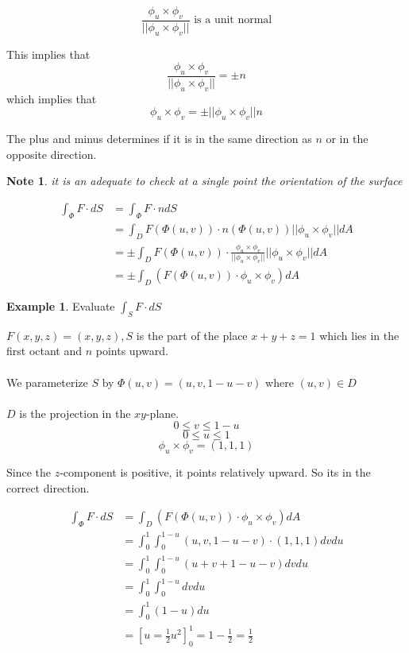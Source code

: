 \documentclass[12pt]{article}
\theoremstyle{plain}
\newtheorem*{note}{Note}
\theoremstyle{definition}
\newtheorem{example}[theorem]{Example}
\begin{document}
$$\frac{\phi_u \times \phi_v}{||\phi_u \times \phi_v||} \text{ is a unit normal}$$

This implies that 
$$\frac{\phi_u \times \phi_v}{||\phi_u \times \phi_v||} = \pm n$$
which implies that
$$\phi_u \times \phi_v = \pm || \phi_u \times \phi_v|| n$$

The plus and minus determines if it is in the same direction as $n$ or in the opposite direction.

\begin{note}
	it is an adequate to check at a single point the orientation of the surface 
\end{note}


\begin{align*}
	\int_\Phi F \cdot dS &= \int_\Phi F \cdot n dS\\
	&= \int_D F (\Phi (u,v)) \cdot n (\Phi(u,v)) || \phi_u \times \phi_v|| dA\\
	&= \pm \int_D F (\Phi (u,v)) \cdot \frac{\phi_u \times \phi_v}{||\phi_u \times \phi_v||} ||\phi_u \times \phi_v|| dA\\
	&= \pm \int_D (F(\Phi (u,v)) \cdot \phi_u \times \phi_v) dA
\end{align*}

\begin{example}
	Evaluate $\int_S F \cdot dS$
	
	$F(x,y,z) = (x,y,z), S$ is the part of the place $x+y+z=1$ which lies in the first octant and $n$ points upward.\\
	\\
	We parameterize $S$ by $\Phi (u,v) = (u,v, 1-u-v)$ where $(u,v)\in D$\\
	\\
	$D$ is the projection in the $xy$-plane.
	$$0 \leq v \leq 1-u$$
	$$0 \leq u \leq 1$$
	$$\phi_u \times \phi_v = (1,1,1)$$
	
	Since the $z$-component is positive, it points relatively upward. So its in the correct direction.
	
	\begin{align*}
		\int_\Phi F \cdot dS &= \int_D (F(\Phi (u,v)) \cdot \phi_u \times \phi_v) dA\\
		&= \int_0^1 \int_0^{1-u} (u,v,1-u-v) \cdot (1,1,1) dv du\\
		&= \int_0^1 \int_0^{1-u} (u+v+1-u-v) dv du\\
		&=\int_0^1 \int_0^{1-u} dv du\\
		&= \int_0^1 (1-u) du\\
		&= [u=\frac{1}{2}u^2]_0^1 = 1 - \frac{1}{2} = \frac{1}{2}
	\end{align*}

	
	
\end{example}
\end{document}

